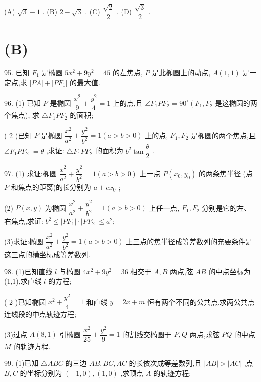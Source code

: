 (A) $\sqrt{3} - 1$ . (B) $2 - \sqrt{3}$ . (C) $\dfrac{\sqrt{2}}{2}$ . (D) $\dfrac{\sqrt{3}}{2}$ .

\section*{(B)}

95. 已知 ${F}_{1}$ 是椭圆 $5{x}^{2} + 9{y}^{2} = {45}$ 的左焦点, $P$ 是此椭圆上的动点, $A\left( {1,1}\right)$ 是一定点,求 $\left| {PA}\right|  + \left| {P{F}_{1}}\right|$ 的最大值.

96. (1) 已知 $P$ 是椭圆 $\dfrac{{x}^{2}}{9} + \dfrac{{y}^{2}}{4} = 1$ 上的点,且 $\angle {F}_{1}P{F}_{2} = {90}^{ \circ  }\left( {{F}_{1},{F}_{2}}\right.$ 是这椭圆的两个焦点), 求 $\bigtriangleup {F}_{1}P{F}_{2}$ 的面积;

( 2 )已知 $P$ 是椭圆 $\dfrac{{x}^{2}}{{a}^{2}} + \dfrac{{y}^{2}}{{b}^{2}} = 1\left( {a > b > 0}\right)$ 上的点, ${F}_{1},{F}_{2}$ 是椭圆的两个焦点,且 $\angle {F}_{1}P{F}_{2}$  $= \theta$ ,求证: $\bigtriangleup {F}_{1}P{F}_{2}$ 的面积为 ${b}^{2}\tan \dfrac{\theta }{2}$ .

97. (1) 求证:椭圆 $\dfrac{{x}^{2}}{{a}^{2}} + \dfrac{{y}^{2}}{{b}^{2}} = 1\left( {a > b > 0}\right)$ 上一点 $P\left( {{x}_{0},{y}_{0}}\right)$ 的两条焦半径 (点 $P$ 和焦点的距离)的长分别为 $a \pm  e{x}_{0}$ ;

(2) $P\left( {x,y}\right)$ 为椭圆 $\dfrac{{x}^{2}}{{a}^{2}} + \dfrac{{y}^{2}}{{b}^{2}} = 1\left( {a > b > 0}\right)$ 上任一点, ${F}_{1},{F}_{2}$ 分别是它的左、右焦点,求证: ${b}^{2} \leq  \left| {P{F}_{1}}\right|  \cdot  \left| {P{F}_{2}}\right|  \leq  {a}^{2};$

(3)求证:椭圆 $\dfrac{{x}^{2}}{{a}^{2}} + \dfrac{{y}^{2}}{{b}^{2}} = 1\left( {a > b > 0}\right)$ 上三点的焦半径成等差数列的充要条件是这三点的横坐标成等差数列.

98. (1)已知直线 $l$ 与椭圆 $4{x}^{2} + 9{y}^{2} = {36}$ 相交于 $A,B$ 两点,弦 ${AB}$ 的中点坐标为(1,1),求直线 $l$ 的方程;

( 2 )已知椭圆 ${x}^{2} + \dfrac{{y}^{2}}{4} = 1$ 和直线 $y = {2x} + m$ 恒有两个不同的公共点,求两公共点连线段的中点轨迹方程;

(3)过点 $A\left( {8,1}\right)$ 引椭圆 $\dfrac{{x}^{2}}{25} + \dfrac{{y}^{2}}{9} = 1$ 的割线交椭圆于 $P,Q$ 两点,求弦 ${PQ}$ 的中点 $M$ 的轨迹方程.

99. (1)已知 $\bigtriangleup  {ABC}$ 的三边 ${AB},{BC},{AC}$ 的长依次成等差数列,且 $\left| {AB}\right|  > \left| {AC}\right|$ ,点 $B,C$ 的坐标分别为 $\left( {-1,0}\right) ,\left( {1,0}\right)$ ,求顶点 $A$ 的轨迹方程;

